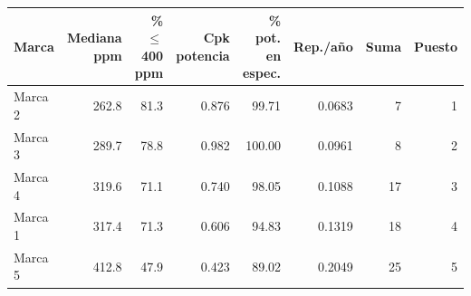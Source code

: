 \begin{tabular}{lrrrrrrr}
\toprule
\textbf{Marca} & \textbf{Mediana ppm} & \textbf{\% $\le$ 400 ppm} & \textbf{Cpk potencia} & \textbf{\% pot. en espec.} & \textbf{Rep./año} & \textbf{Suma} & \textbf{Puesto} \\ \midrule
Marca 2 & 262.8 & 81.3 & 0.876 & 99.71 & 0.0683 & 7 & 1 \\
Marca 3 & 289.7 & 78.8 & 0.982 & 100.00 & 0.0961 & 8 & 2 \\
Marca 4 & 319.6 & 71.1 & 0.740 & 98.05 & 0.1088 & 17 & 3 \\
Marca 1 & 317.4 & 71.3 & 0.606 & 94.83 & 0.1319 & 18 & 4 \\
Marca 5 & 412.8 & 47.9 & 0.423 & 89.02 & 0.2049 & 25 & 5 \\
\bottomrule
\end{tabular}